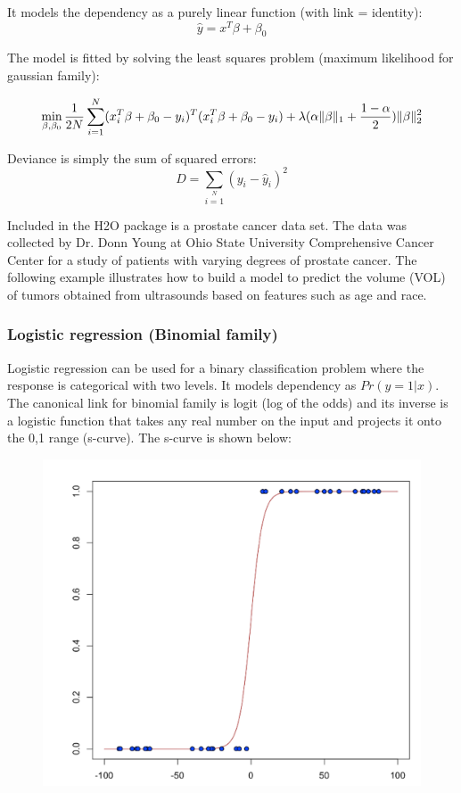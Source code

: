 It models the dependency as a purely linear function (with link = identity):
\[ \hat{y} = x^T\beta + \beta_0\]

The model is fitted by solving the least squares problem (maximum likelihood for gaussian family):

\[ \min\limits_{\beta,\beta_0} { {1 \over 2N}\sum\limits_{i=1}\limits^{N}(x_i^{T}\beta  + \beta_0- y_i)^T (x_i^{T}\beta + \beta_0 - y_i)  + \lambda (\alpha \|\beta \|_1 + {1-\alpha \over 2}) \| \beta \|_2^2} \]

Deviance is simply the sum of squared errors:
\[ D = \sum\limits_{i=1}\limits^{N}{(y_i - \hat{y}_i)^2} \]

\waterExampleInR

Included in the H2O package is a prostate cancer data set. The data was collected by Dr. Donn Young at Ohio State
University Comprehensive Cancer Center for a study of patients with varying degrees of prostate cancer. The
following example illustrates how to build a model to predict the volume (VOL) of tumors obtained from ultrasounds
based on features such as age and race.



\waterExampleInPython


\subsubsection{Logistic regression (Binomial family)}
Logistic regression can be used for a binary classification problem where the response is categorical with two
levels. It models dependency as $Pr(y = 1|x)$. The canonical link for binomial family is logit (log of the odds)
and its inverse is a logistic function that takes any real number on the input and projects it onto the 0,1 range
(s-curve).  The s-curve is shown below:

\begin{figure}[h]
\centering
\includegraphics[scale=0.5]{images/scurve.png}
\end{figure}

